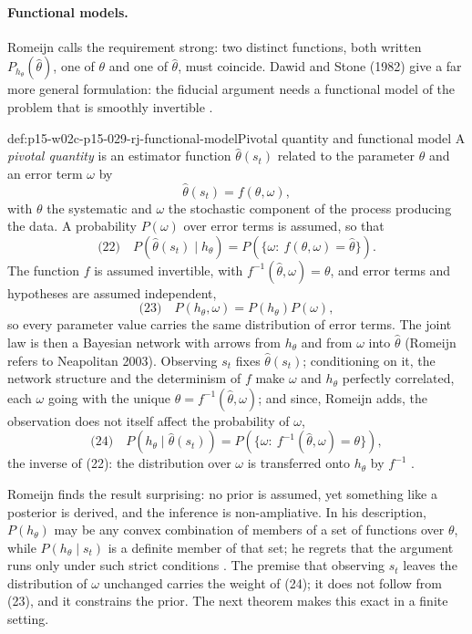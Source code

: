 \paragraph{Functional models.}
Romeijn calls the requirement strong: two distinct functions, both
written \(P_{h_\theta}(\hat\theta)\), one of \(\theta\) and one of
\(\hat\theta\), must coincide. Dawid and Stone (1982) give a far more
general formulation: the fiducial argument needs a functional model of
the problem that is smoothly invertible
\cite[p.~647]{Romeijn2011InductiveLogicStatistics}.

\begin{hbdefinition}{def:p15-w02c-p15-029-rj-functional-model}{Pivotal quantity and functional model}
A \emph{pivotal quantity} is an estimator function \(\hat\theta(s_t)\)
related to the parameter \(\theta\) and an error term \(\omega\) by
\[
 \hat\theta(s_t)=f(\theta,\omega),
\]
with \(\theta\) the systematic and \(\omega\) the stochastic component of
the process producing the data. A probability \(P(\omega)\) over error
terms is assumed, so that
\[
 \text{(22)}\quad P(\hat\theta(s_t)\mid h_\theta)=P(\{\omega:\ f(\theta,\omega)=\hat\theta\}).
\]
The function \(f\) is assumed invertible, with \(f^{-1}(\hat\theta,\omega)=\theta\),
and error terms and hypotheses are assumed independent,
\[
 \text{(23)}\quad P(h_\theta,\omega)=P(h_\theta)P(\omega),
\]
so every parameter value carries the same distribution of error terms.
The joint law is then a Bayesian network with arrows from \(h_\theta\)
and from \(\omega\) into \(\hat\theta\) (Romeijn refers to Neapolitan
2003). Observing \(s_t\) fixes \(\hat\theta(s_t)\); conditioning on it,
the network structure and the determinism of \(f\) make \(\omega\) and
\(h_\theta\) perfectly correlated, each \(\omega\) going with the unique
\(\theta=f^{-1}(\hat\theta,\omega)\); and since, Romeijn adds, the
observation does not itself affect the probability of \(\omega\),
\[
 \text{(24)}\quad P(h_\theta\mid\hat\theta(s_t))=P(\{\omega:\ f^{-1}(\hat\theta,\omega)=\theta\}),
\]
the inverse of (22): the distribution over \(\omega\) is transferred onto
\(h_\theta\) by \(f^{-1}\) \cite[pp.~647--648]{Romeijn2011InductiveLogicStatistics}.
\end{hbdefinition}

Romeijn finds the result surprising: no prior is assumed, yet something
like a posterior is derived, and the inference is non-ampliative. In
his description, \(P(h_\theta)\) may be any convex combination of
members of a set of functions over \(\theta\), while \(P(h_\theta\mid s_t)\)
is a definite member of that set; he regrets that the argument runs only
under such strict conditions \cite[p.~648]{Romeijn2011InductiveLogicStatistics}.
The premise that observing \(s_t\) leaves the distribution of
\(\omega\) unchanged carries the weight of (24); it does not follow from
(23), and it constrains the prior. The next theorem makes this exact in
a finite setting.

